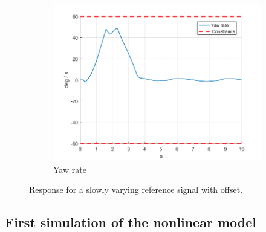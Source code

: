 \documentclass[11pt]{article}
\begin{document}
\begin{enumerate}
\begin{figure}[ht]
\begin{subfigure}[c]{0.3\linewidth}
            \includegraphics[width=\linewidth]{Plots_06_ReferenceTracking_Varying/06}
            \caption{Yaw rate}
        \end{subfigure}
        \caption{Response for a slowly varying reference signal with offset.}
        \label{fig:varying_reference_with_offset}
\end{figure}
\end{enumerate}



\subsection*{First simulation of the nonlinear model} %
\label{sub:first_simulation_of_the_nonlinear_model}
\end{document}
